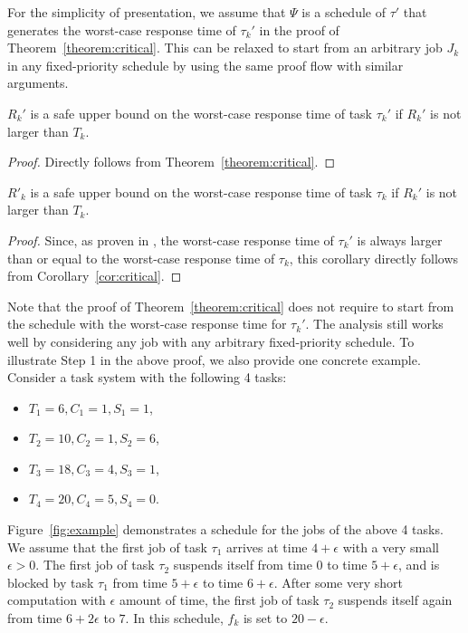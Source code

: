 For the simplicity of presentation, we assume that $\Psi$ is a schedule of $\tau'$ that generates the worst-case response time of $\tau_k'$ in the proof of Theorem~\ref{theorem:critical}. This can be relaxed to start from an arbitrary job $J_k$ in any fixed-priority schedule by using the same proof flow with similar arguments.

\begin{Corollary}
\label{cor:critical}
 $R_k'$ is a safe upper bound on the worst-case response time of task $\tau_k'$ if $R_k'$ is not larger than $T_k$.
\end{Corollary}
\begin{proof}
Directly follows from Theorem~\ref{theorem:critical}.
\end{proof}



\begin{Corollary}
$R'_k$ is a safe upper bound on the worst-case response time of task $\tau_k$ if $R_k'$ is not larger than $T_k$. 
\end{Corollary}
\begin{proof}
Since, as proven in \cite{Rajkumar_1990,Liu_2014}, the worst-case response time of $\tau_k'$ is always larger than or equal to the worst-case response time of $\tau_k$, this corollary directly follows from Corollary~\ref{cor:critical}. 
\end{proof}



Note that the proof of Theorem~\ref{theorem:critical} does not require to start from the schedule with the worst-case response time  for $\tau_k'$. The analysis still works well by considering any job with any arbitrary fixed-priority schedule.   
To illustrate Step 1 in the above proof, we also provide one concrete example. Consider a task system with the following 4 tasks:
\begin{itemize}
\item $T_1 = 6, C_1 = 1, S_1 = 1$,
\item $T_2 = 10, C_2 = 1, S_2 = 6$,
\item $T_3 = 18, C_3 = 4, S_3 = 1$,
\item $T_4 = 20, C_4 = 5, S_4 = 0$.
\end{itemize}

Figure~\ref{fig:example} demonstrates a schedule for the jobs of the
above 4 tasks. We assume that the first job of task $\tau_1$ arrives
at time $4+\epsilon$ with a very small $\epsilon > 0$. The first job
of task $\tau_2$ suspends itself from time $0$ to time $5+\epsilon$,
and is blocked by task $\tau_1$ from time $5+\epsilon$ to time
$6+\epsilon$. After some very short computation with $\epsilon$ amount
of time, the first job of task $\tau_2$ suspends itself again from
time $6+2\epsilon$ to $7$.   In this schedule, $f_k$ is set to $20-\epsilon$.

